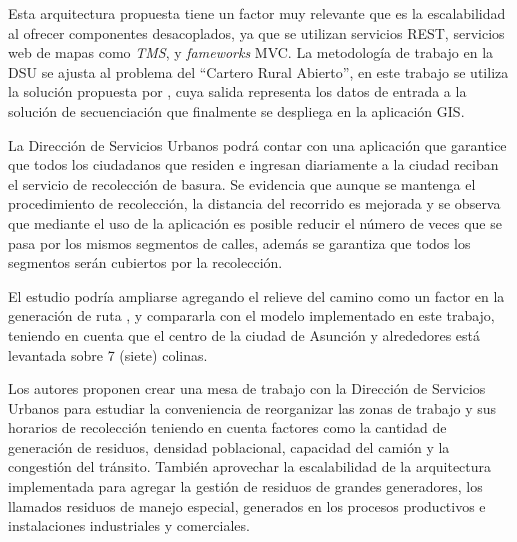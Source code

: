 \documentclass[conference,compsoc]{IEEEtran}
\begin{document}
Esta arquitectura propuesta tiene un factor muy relevante que es la escalabilidad al ofrecer componentes desacoplados, ya que se utilizan servicios REST, servicios web de mapas como \textit{TMS}, y \textit{fameworks} MVC. La metodología de trabajo en la DSU se ajusta al problema del ``Cartero Rural Abierto'', en este trabajo se utiliza la solución propuesta por \cite{Braier2017AnArgentina}, cuya salida representa los datos de entrada a la solución de secuenciación que finalmente se despliega en la aplicación GIS.

La Dirección de Servicios Urbanos podrá contar con una aplicación que garantice que todos los ciudadanos que residen e ingresan diariamente a la ciudad reciban el servicio de recolección de basura. Se evidencia que aunque se mantenga el procedimiento de recolección, la distancia del recorrido es mejorada y se observa que mediante el uso de la aplicación es posible reducir el número de veces que se pasa por los mismos segmentos de calles, además se garantiza que todos los segmentos serán cubiertos por la recolección.

El estudio podría ampliarse agregando el relieve del camino como un factor en la generación de ruta \cite{Sulemana2018OptimalMethods}, y compararla con el modelo implementado en este trabajo, teniendo en cuenta que el centro de la ciudad de Asunción y alrededores está levantada sobre 7 (siete) colinas.

Los autores proponen crear una mesa de trabajo con la Dirección de Servicios Urbanos para estudiar la conveniencia de reorganizar las zonas de trabajo y sus horarios de recolección teniendo en cuenta factores como la cantidad de generación de residuos, densidad poblacional, capacidad del camión y la congestión del tránsito. También aprovechar la escalabilidad de la arquitectura implementada para agregar la gestión de residuos de grandes generadores, los llamados residuos de manejo especial, generados en los procesos productivos e instalaciones industriales y comerciales.







\vspace{12pt}
\end{document}
